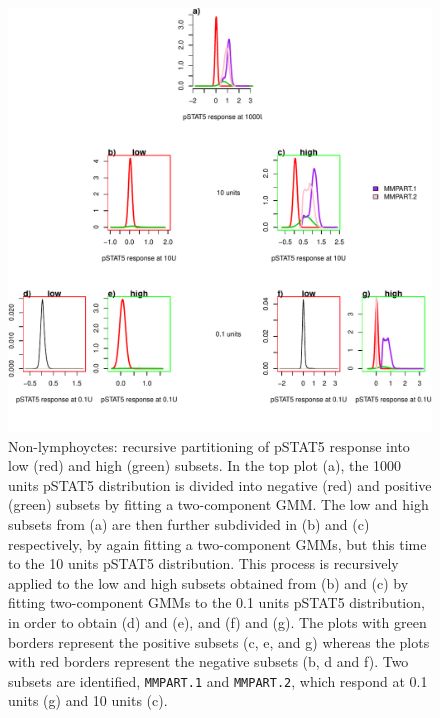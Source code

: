 %
\begin{figure}[!h]
\centering
\includegraphics[scale=.7]{figures/mmpart-nonlymphocytes-tree}
{ Non-lymphoyctes: recursive partitioning of pSTAT5 response into low (red) and high (green) subsets. }
{
    In the top plot (a), the 1000 units pSTAT5 distribution is divided into negative (red) and positive (green) subsets by fitting a two-component \gls{GMM}.
    The low and high subsets from (a) are then further subdivided in (b) and (c) respectively, by again fitting a two-component \glspl{GMM},
    but this time to the 10 units pSTAT5 distribution.
    This process is recursively applied to the low and high subsets obtained from (b) and (c) by fitting two-component \glspl{GMM} to the 0.1 units pSTAT5 distribution, in order
    to obtain (d) and (e), and (f) and (g).
    The plots with green borders represent the positive subsets (c, e, and g) whereas the plots with red borders represent the negative subsets (b, d and f).
    Two subsets are identified, \texttt{MMPART.1} and \texttt{MMPART.2}, which respond at 0.1 units (g) and 10 units (c).
}
\end{figure}

